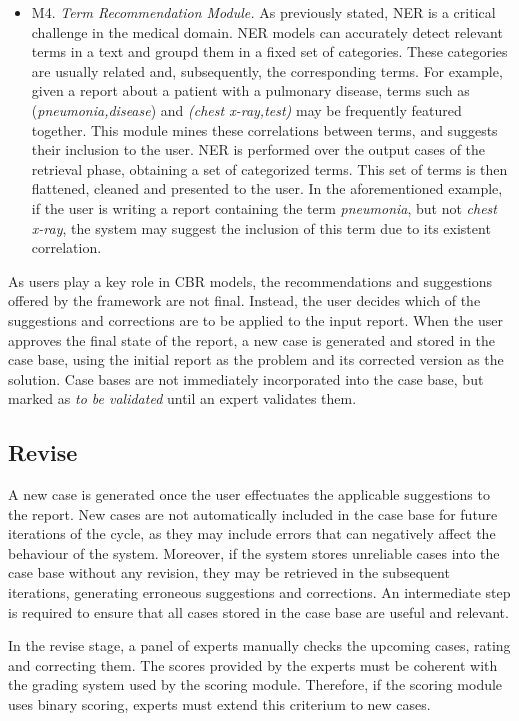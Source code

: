 \begin{itemize}
    \item M4. \textit{Term Recommendation Module.} As previously stated, NER is a critical challenge in the medical domain. NER models can accurately detect relevant terms in a text and groupd them in a fixed set of categories. These categories are usually related and, subsequently, the corresponding terms. For example, given a report about a patient with a pulmonary disease, terms such as (\textit{pneumonia,disease}) and \textit{(chest x-ray,test)} may be frequently featured together. This module mines these correlations between terms, and suggests their inclusion to the user. NER is performed over the output cases of the retrieval phase, obtaining a set of categorized terms. This set of terms is then flattened, cleaned and presented to the user. In the aforementioned example, if the user is writing a report containing the term \textit{pneumonia}, but not \textit{chest x-ray}, the system may suggest the inclusion of this term due to its existent correlation.

\end{itemize}

As users play a key role in CBR models, the recommendations and suggestions offered by the framework are not final. Instead, the user decides which of the suggestions and corrections are to be applied to the input report. When the user approves the final state of the report, a new case is generated and stored in the case base, using the initial report as the problem and its corrected version as the solution. Case bases are not immediately incorporated into the case base, but marked as \textit{to be validated} until an expert validates them.

\subsection*{Revise}\label{5_sec:dl_powered_cbr_revise}
A new case is generated once the user effectuates the applicable suggestions to the report. New cases are not automatically included in the case base for future iterations of the cycle, as they may include errors that can negatively affect the behaviour of the system. Moreover, if the system stores unreliable cases into the case base without any revision, they may be retrieved in the subsequent iterations, generating erroneous suggestions and corrections. An intermediate step is required to ensure that all cases stored in the case base are useful and relevant. 

In the revise stage, a panel of experts manually checks the upcoming cases, rating and correcting them. The scores provided by the experts must be coherent with the grading system used by the scoring module. Therefore, if the scoring module uses binary scoring, experts must extend this criterium to new cases.


